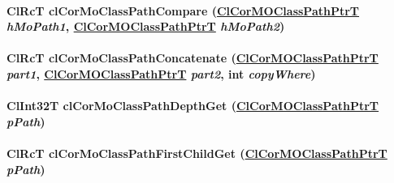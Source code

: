 \hypertarget{group__group13_ga105}{
\paragraph[clCorMoClassPathCompare]{\setlength{\rightskip}{0pt plus 5cm}Cl\-Rc\-T cl\-Cor\-Mo\-Class\-Path\-Compare (\hyperlink{struct_cl_cor_m_o_class_path}{Cl\-Cor\-MOClass\-Path\-Ptr\-T} {\em h\-Mo\-Path1}, \hyperlink{struct_cl_cor_m_o_class_path}{Cl\-Cor\-MOClass\-Path\-Ptr\-T} {\em h\-Mo\-Path2})}\hfill}
\label{group__group13_ga105}


\hypertarget{group__group13_ga106}{
\paragraph[clCorMoClassPathConcatenate]{\setlength{\rightskip}{0pt plus 5cm}Cl\-Rc\-T cl\-Cor\-Mo\-Class\-Path\-Concatenate (\hyperlink{struct_cl_cor_m_o_class_path}{Cl\-Cor\-MOClass\-Path\-Ptr\-T} {\em part1}, \hyperlink{struct_cl_cor_m_o_class_path}{Cl\-Cor\-MOClass\-Path\-Ptr\-T} {\em part2}, int {\em copy\-Where})}\hfill}
\label{group__group13_ga106}


\hypertarget{group__group13_ga101}{
\paragraph[clCorMoClassPathDepthGet]{\setlength{\rightskip}{0pt plus 5cm}Cl\-Int32T cl\-Cor\-Mo\-Class\-Path\-Depth\-Get (\hyperlink{struct_cl_cor_m_o_class_path}{Cl\-Cor\-MOClass\-Path\-Ptr\-T} {\em p\-Path})}\hfill}
\label{group__group13_ga101}


\hypertarget{group__group13_ga103}{
\paragraph[clCorMoClassPathFirstChildGet]{\setlength{\rightskip}{0pt plus 5cm}Cl\-Rc\-T cl\-Cor\-Mo\-Class\-Path\-First\-Child\-Get (\hyperlink{struct_cl_cor_m_o_class_path}{Cl\-Cor\-MOClass\-Path\-Ptr\-T} {\em p\-Path})}\hfill}
\label{group__group13_ga103}


